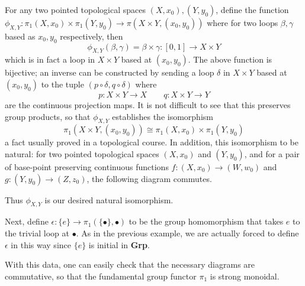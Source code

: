 \begin{example}
    For any two pointed topological spaces $(X, x_0), (Y, y_0)$, define 
    the function $\phi_{X,Y}: \pi_1(X, x_0) \times \pi_1(Y, y_0) \to \pi(X \times Y, (x_0, y_0))$ 
    where for two loops $\beta, \gamma$ based as $x_0, y_0$ respectively, then 
    \[
        \phi_{X, Y}(\beta, \gamma) = \beta \times \gamma: [0, 1] \to X \times Y
    \]
    which is in fact a loop in $X \times Y$ based at $(x_0, y_0)$. The above function is bijective; an inverse 
    can be constructed by sending a loop $\delta$ in $X \times Y$ 
    based at $(x_0, y_0)$ to the tuple $(p\circ \delta, q \circ \delta)$ 
    where 
    \[
        p: X \times Y \to X \qquad q: X \times Y \to Y  
    \]
    are the continuous projection maps. It is not difficult to see that this preserves group 
    products, so that $\phi_{X, Y}$ establishes the isomorphism
    \[
        \pi_1(X \times Y, (x_0, y_0)) \cong \pi_1(X, x_0) \times \pi_1(Y, y_0)
    \]
    a fact usually proved in a topological course.
    In addition, this isomorphism to be natural: for two pointed topological spaces 
    $(X, x_0)$ and $(Y, y_0)$, and for a pair of base-point preserving continuous 
    functions $f: (X, x_0) \to (W, w_0)$ and $g: (Y, y_0) \to (Z, z_0)$, 
    the following diagram commutes. 
    \begin{center}
    \end{center}
    Thus $\phi_{X,Y}$ is our desired natural isomorphism. 

    Next, define $\epsilon: \{e\} \to \pi_1(\{\bullet\}, \bullet)$
    to be the group homomorphism that takes $e$ to the trivial loop at $\bullet$. 
    As in the previous example, we are actually forced to define $\epsilon$ in this 
    way since $\{e\}$ is initial in \textbf{Grp}. 

    With this data, one can easily check that the necessary diagrams are commutative, 
    so that the fundamental group functor $\pi_1$ is strong monoidal. 
\end{example}

